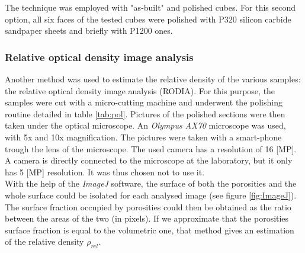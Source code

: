The technique was employed with "as-built" and polished cubes. For this second option, all six faces of the tested cubes were polished with P320 silicon carbide sandpaper sheets and briefly with P1200 ones.\\

\subsubsection{Relative optical density image analysis}

Another method was used to estimate the relative density of the various samples: the relative optical density image analysis (RODIA). For this purpose, the samples were cut with a micro-cutting machine and underwent the polishing routine detailed in table \ref{tab:pol}. Pictures of the polished sections were then taken under the optical microscope. An \textit{Olympus AX70} microscope was used, with 5x and 10x magnification. The pictures were taken with a smart-phone trough the lens of the microscope. The used camera has a resolution of 16 [MP]. A camera is directly connected to the microscope at the laboratory, but it only has 5 [MP] resolution. It was thus chosen not to use it. \\

With the help of the \textit{ImageJ} software, the surface of both the porosities and the whole surface could be isolated for each analysed image (see figure \ref{fig:ImageJ}). The surface fraction occupied by porosities could then be obtained as the ratio between the areas of the two (in pixels). If we approximate that the porosities surface fraction is equal to the volumetric one, that method gives an estimation of the relative density $\rho_{rel}$.

\begin{center}
\begin{table}[ht]
\noindent{}

\caption[Polishing routine for Al-Si alloys]{Polishing routine for Al-Si alloys}
\label{tab:pol}
\end{table}
\end{center}

